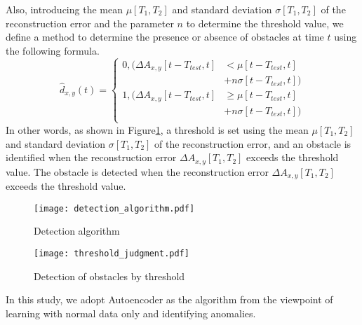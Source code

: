 \documentclass[paper]{ieice}
\begin{document}
%
Also, introducing the mean $\mu[T_1,T_2]$ and standard deviation $\sigma[T_1,T_2]$ of the reconstruction error and the parameter $n$ to determine the threshold value, we define a method to determine the presence or absence of obstacles at time $t$ using the following formula.
%
\begin{equation}
  \hat{d}_{x,y}(t) =
  \begin{cases}
    0, (\Delta{A}_{x,y}[t-T_{test},t] & < \mu[t-T_{test},t]      \\
                                      & + n\sigma[t-T_{test},t]) \\
    1, (\Delta{A}_{x,y}[t-T_{test},t] & \geq \mu[t-T_{test},t]   \\
                                      & + n\sigma[t-T_{test},t]) \\
  \end{cases}
  \label{eq:discrimination}
\end{equation}
%
In other words, as shown in Figure\ref{fig:detection_algorithm}, a threshold is set using the mean $\mu[T_1,T_2]$ and standard deviation $\sigma[T_1,T_2]$ of the reconstruction error, and an obstacle is identified when the reconstruction error $\Delta A_{x,y}[T_1,T_2]$ exceeds the threshold value. The obstacle is detected when the reconstruction error $\Delta A_{x,y}[T_1,T_2]$ exceeds the threshold value.
%
\begin{figure}[tb]
  \centering
  \texttt{[image: detection\_algorithm.pdf]}
  \caption{Detection algorithm}
  \label{fig:detection_algorithm}
\end{figure}
%
\begin{figure}[tb]
  \begin{center}
    \texttt{[image: threshold\_judgment.pdf]}
  \end{center}
  \caption{Detection of obstacles by threshold}
  \label{fig:threshold_judgment}
\end{figure}
%
%
In this study, we adopt Autoencoder as the algorithm from the viewpoint of learning with normal data only and identifying anomalies.
%


\begin{thebibliography}{99}%
\bibitem{}
\end{thebibliography}

\end{document}
